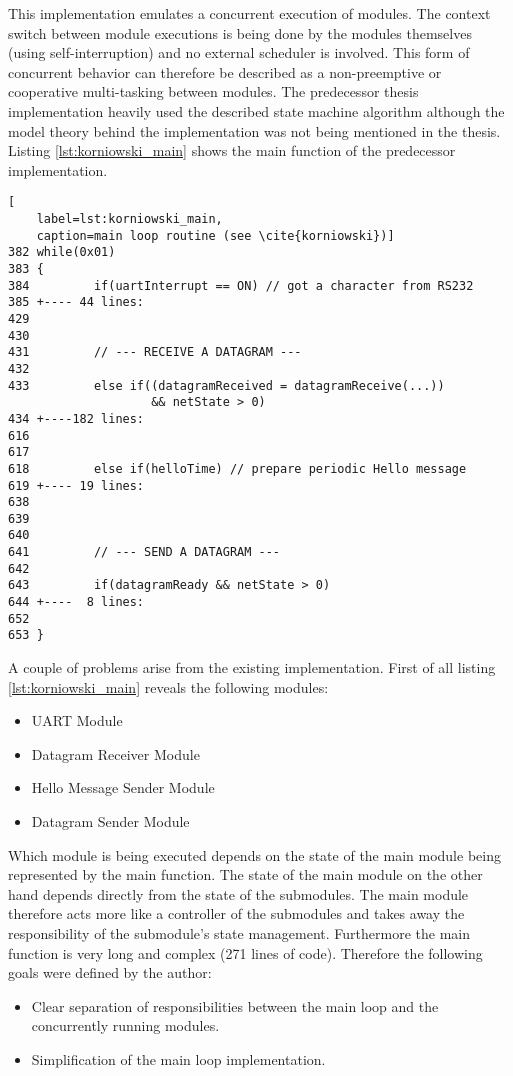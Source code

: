 This implementation emulates a concurrent execution of modules. The context switch between module executions is being done by the modules themselves (using self-interruption) and no external scheduler is involved. This form of concurrent behavior can therefore be described as a non-preemptive or cooperative multi-tasking between modules. The predecessor thesis \cite{korniowski} implementation heavily used the described state machine algorithm although the model theory behind the implementation was not being mentioned in the thesis. Listing \ref{lst:korniowski_main} shows the main function of the predecessor implementation.

\begin{lstlisting}[
	label=lst:korniowski_main,
	caption=main loop routine (see \cite{korniowski})]
382 while(0x01)
383 {
384         if(uartInterrupt == ON) // got a character from RS232
385 +---- 44 lines: 
429 
430 
431         // --- RECEIVE A DATAGRAM ---
432 
433         else if((datagramReceived = datagramReceive(...)) 
                    && netState > 0)     
434 +----182 lines: 
616 
617     
618         else if(helloTime) // prepare periodic Hello message
619 +---- 19 lines: 
638 
639 
640     
641         // --- SEND A DATAGRAM ---
642     
643         if(datagramReady && netState > 0)
644 +----  8 lines: 
652 
653 }
\end{lstlisting}

A couple of problems arise from the existing implementation. First of all listing \ref{lst:korniowski_main} reveals the following modules:

\begin{itemize}
\item UART Module
\item Datagram Receiver Module
\item Hello Message Sender Module
\item Datagram Sender Module
\end{itemize}

Which module is being executed depends on the state of the main module being represented by the main function. The state of the main module on the other hand depends directly from the state of the submodules. The main module therefore acts more like a controller of the submodules and takes away the responsibility of the submodule's state management. Furthermore the main function is very long and complex (271 lines of code). Therefore the following goals were defined by the author:

\begin{itemize}
\item Clear separation of responsibilities between the main loop and the concurrently running modules.
\item Simplification of the main loop implementation.
\end{itemize}

